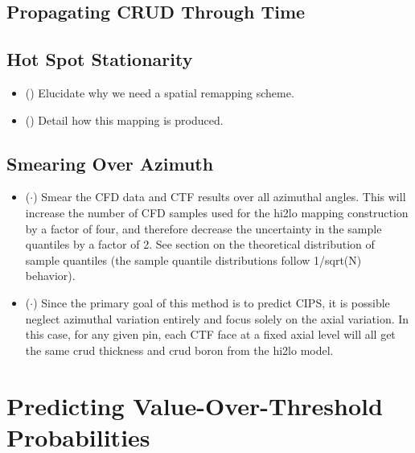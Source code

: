 \subsection{Propagating CRUD Through Time}
\subsection{Hot Spot Stationarity}
\begin{itemize}
        \item (\checkmark) Elucidate why we need a spatial remapping scheme.
        \item (\checkmark) Detail how this mapping is produced.
\end{itemize}

\subsection{Smearing Over Azimuth}

\begin{itemize}
        \item ($\cdot$) Smear the CFD data and CTF results over all azimuthal angles.  This will increase the number of CFD samples used for the hi2lo mapping construction by a factor of four, and therefore decrease the uncertainty in the sample quantiles by a factor of 2.  See section on the theoretical distribution of sample quantiles (the sample quantile distributions follow 1/sqrt(N) behavior).
        \item ($\cdot$) Since the primary goal of this method is to predict CIPS, it is possible neglect azimuthal variation entirely and focus solely on the axial variation.  In this case, for any given pin, each CTF face at a fixed axial level will all get the same crud thickness and crud boron from the hi2lo model.
\end{itemize}

\section{Predicting Value-Over-Threshold Probabilities}


